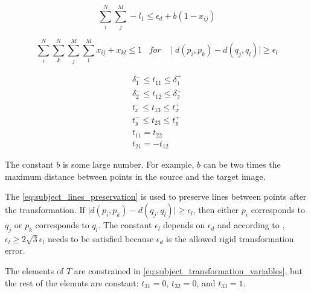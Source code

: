         \begin{equation}
            \label{eq:subject_transformation_negative_1}
            \sum_{i}^{N} \sum_{j}^{M} -l_{1} \leq \epsilon_d + b (1 - x_{ij})
        \end{equation}

        \begin{equation}
            \label{eq:subject_lines_preservation}
            \sum_{i}^{N} \sum_{k}^{N} \sum_{j}^{M} \sum_{l}^{M} x_{ij} + x_{kl} \leq 1 \;\;\; for \;\;\; \mid d(p_i, p_k) - d(q_j, q_l) \mid \geq \epsilon_l
        \end{equation}

        \begin{equation}
            \label{eq:subject_transformation_variables}
            \begin{gathered}
                \delta_1^- \leq t_{11} \leq \delta_1^+ \\
                \delta_2^- \leq t_{12} \leq \delta_2^+ \\
                t_x^- \leq t_{13} \leq t_x^+ \\
                t_y^- \leq t_{23} \leq t_y^+ \\
                t_{11} = t_{22} \\
                t_{21} = -t_{12}
            \end{gathered}
        \end{equation}
        

        The constant $b$ is some large number. For example, $b$ can be two times the maximum distance between points in the source and the target image.

        The \autoref{eq:subject_lines_preservation} is used to preserve lines between points after the transformation.
        If $\mid d(p_i, p_k) - d(q_j, q_l) \mid \geq \epsilon_l$, then either $p_i$ corresponds to $q_j$ or $p_k$ corresponds to $q_l$.
        The constant $\epsilon_l$ depends on $\epsilon_d$ and according to \cite{Sakakubara_2007_automatic}, 
        $\epsilon_l \geq 2 \sqrt{3} \epsilon_l$ needs to be satisfied because $\epsilon_d$ is the allowed rigid transformation error.

        The elements of $T$ are constrained in \autoref{eq:subject_transformation_variables},
        but the rest of the elemnts are constant: $t_{31} = 0$, $t_{32} = 0$, and $t_{33} = 1$.
          

